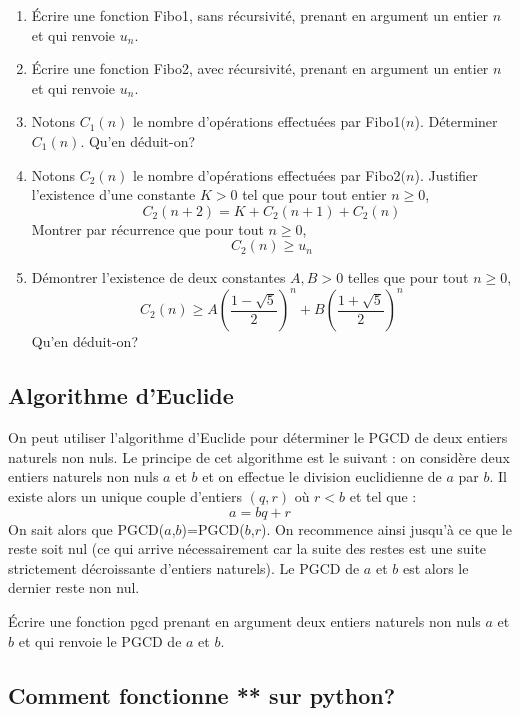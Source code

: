 \documentclass[french,11pt,twoside]{VcCours}
\begin{document}
\begin{enumerate}
\item Écrire une fonction Fibo1, sans récursivité, prenant en argument un entier $n$ et qui renvoie $u_n$.
\item Écrire une fonction Fibo2, avec récursivité, prenant en argument un entier $n$ et qui renvoie $u_n$.
\item Notons $C_1(n)$ le nombre d'opérations effectuées par Fibo1$(n$). Déterminer $C_1(n)$. Qu'en déduit-on?
\item Notons $C_2(n)$ le nombre d'opérations effectuées par Fibo2$(n$). Justifier l'existence d'une constante $K> 0$ tel que pour tout entier $n \geq 0$,
$$ C_{2}(n+2) = K + C_2(n+1)+C_2(n)$$
Montrer par récurrence que pour tout $n \geq 0$,
$$ C_2(n) \geq u_n$$
\item Démontrer l'existence de deux constantes $A,B>0$ telles que pour tout $n \geq 0$,
$$ C_2(n) \geq  A \left( \frac{1- \sqrt{5}}{2} \right)^n + B \left( \frac{1+ \sqrt{5}}{2} \right)^n  $$
Qu'en déduit-on?                     
\end{enumerate}
\subsection{Algorithme d'Euclide}

On peut utiliser l'algorithme d'Euclide pour déterminer le PGCD de deux entiers naturels non nuls. Le principe de cet algorithme est le suivant : on considère deux entiers naturels non nuls $a$ et $b$ et on effectue le division euclidienne de $a$ par $b$. Il existe alors un unique couple d'entiers $(q,r)$ où $r<b$ et tel que :
$$a =bq+r$$
On sait alors que PGCD($a$,$b$)=PGCD($b$,$r$). On recommence ainsi jusqu'à ce que le reste soit nul (ce qui arrive nécessairement car la suite des restes est une suite strictement décroissante d'entiers naturels). Le PGCD de $a$ et $b$ est alors le dernier reste non nul.

Écrire une fonction pgcd prenant en argument deux entiers naturels non nuls $a$ et $b$ et qui renvoie le PGCD de $a$ et $b$.

\subsection{Comment fonctionne **  sur python?}
\end{document}
